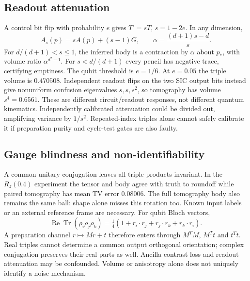 \documentclass[11pt]{article}
\begin{document}
\subsection{Readout attenuation}
A control bit flip with probability $e$ gives $T'=sT$, $s=1-2e$. In any dimension,
\begin{equation}
A_s(p)=sA(p)+(s-1)G,\qquad \alpha=\frac{(d+1)s-d}{s}.
\end{equation}
For $d/(d+1)<s\le1$, the inferred body is a contraction by $\alpha$ about $p_*$,
with volume ratio $\alpha^{d^2-1}$. For $s<d/(d+1)$ every pencil has negative
trace, certifying emptiness. The qubit threshold is $e=1/6$.
At $e=0.05$ the triple volume is $0.470508$.
Independent readout flips on the two SIC output bits instead give nonuniform
confusion eigenvalues $s,s,s^2$, so tomography has volume $s^4=0.6561$.
These are different circuit/readout responses, not different quantum kinematics.
Independently calibrated attenuation could be divided out, amplifying variance
by $1/s^2$. Repeated-index triples alone cannot safely calibrate it if preparation
purity and cycle-test gates are also faulty.

\subsection{Gauge blindness and non-identifiability}
A common unitary conjugation leaves all triple products invariant. In the
$R_z(0.4)$ experiment the tensor and body agree with truth to roundoff while
paired tomography has mean TV error $0.08006$. The full tomography body also
remains the same ball: shape alone misses this rotation too. Known input labels
or an external reference frame are necessary.
For qubit Bloch vectors,
\begin{equation}
\operatorname{Re}\operatorname{Tr}(\rho_i\rho_j\rho_k)
=\tfrac14(1+r_i\cdot r_j+r_j\cdot r_k+r_k\cdot r_i).
\end{equation}
A preparation channel $r\mapsto Mr+t$ therefore enters through $M^TM$, $M^Tt$
and $t^Tt$. Real triples cannot determine a common output orthogonal orientation;
complex conjugation preserves their real parts as well. Ancilla contrast loss
and readout attenuation may be confounded. Volume or anisotropy alone does not
uniquely identify a noise mechanism.
\end{document}
